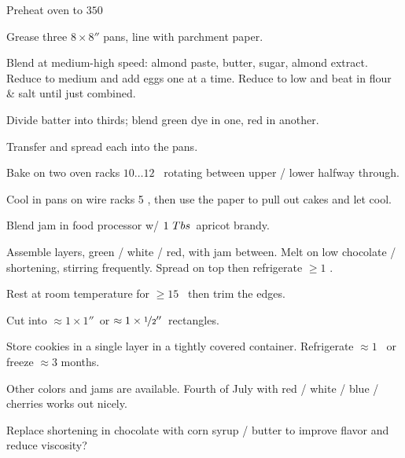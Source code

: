 \begin{preparation}
\item Preheat oven to $350$ \Fahrenheit

\item Grease three $8\times8''$ pans, line with parchment paper.

\item Blend at medium-high speed: almond paste, butter, sugar, almond extract.
Reduce to medium and add eggs one at a time.
Reduce to low and beat in flour \& salt until just combined.

\item Divide batter into thirds; blend green dye in one, red in another.

\item Transfer and spread each into the pans.

\item Bake on two oven racks $10 \dots 12$ \minute~rotating between upper / lower halfway through.

\item Cool in pans on wire racks 5 \minute,
	then use the paper to pull out cakes and let cool.

\item Blend jam in food processor w/ $1~Tbs$~apricot brandy.

\item Assemble layers, green / white / red, with jam between.
	Melt on low chocolate / shortening, stirring frequently.
	Spread on top then refrigerate $\geq1$ \hour.

\item Rest at room temperature for $\geq 15$ \minute~then trim the edges.

\item Cut into $\approx 1\times 1''$~or $\approx 1\times \nicefrac{1}{2}''$~rectangles.

\item Store cookies in a single layer in a tightly covered container.
	Refrigerate $\approx 1$ \week~or freeze $\approx 3$ months.
\end{preparation}


\begin{variation}
\item Other colors and jams are available.
	Fourth of July with red / white / blue / cherries works out nicely.
\end{variation}


\begin{experiments}
\item Replace shortening in chocolate with corn syrup / butter to improve flavor and reduce viscosity?
\end{experiments}


\recipeend%
